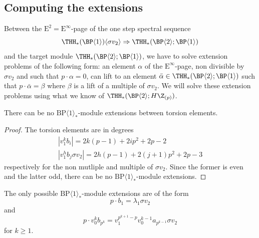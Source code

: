 
\subsection{Computing the extensions}\label{sec:extensions}

Between the $\mathrm{E}^2= \mathrm{E}^\infty$-page of the one step spectral sequence
\begin{equation}
  \THH_*(\BP \langle 1 \rangle)\langle \sigma v_2 \rangle \Rightarrow \THH_*(\BP \langle 2 \rangle ; \BP \langle 1 \rangle)
\end{equation}
and the target module $\THH_*(\BP \langle 2 \rangle ; \BP \langle 1 \rangle)$, we have to solve extension problems of the following form: an element $\alpha$ of the $\mathrm{E}^\infty$-page, non divisible by $\sigma v_2$ and such that $p \cdot \alpha = 0$, can lift to an element $\bar{\alpha} \in \THH_*(\BP \langle 2 \rangle ; \BP \langle 1 \rangle)$ such that $p \cdot \bar{\alpha} = \beta$ where $\beta$ is a lift of a multiple of $\sigma v_2$. We will solve these extension problems using what we know of $\THH_*(\BP \langle 2 \rangle ; H\Z_{(p)})$. 

\begin{lemma}\label{lem432}
  There can be no $\mathrm{BP}\langle 1\rangle_*$-module extensions between torsion elements.
\end{lemma}

\begin{proof}
  The torsion elements are in degrees
  \begin{equation}
    \begin{gathered}
      |v_1^k b_i | = 2k(p-1) + 2i p^2 + 2p - 2 \\
      |v_1^h b_j \sigma v_2| = 2h(p-1) + 2(j+1)p^2 + 2p - 3
    \end{gathered}
  \end{equation}
  respectively for the non mutliple and multiple of $\sigma v_2$. Since the former is even and the latter odd, there can be no $\mathrm{BP}\langle 1\rangle_*$-module extensions.
\end{proof}


\begin{lemma} \label{lem:onlyextensions}
  The only possible $\mathrm{BP}\langle 1\rangle_*$-module extensions %
  are of the form
  \begin{equation}
    p \cdot b_1 = \lambda_1 \sigma v_2
  \end{equation}
  and
  \begin{equation}
    p \cdot v_0^k b_{p^k} = v_1^{p^{k+1} - p}v_0^{k-1} a_{p^{k-1}} \sigma v_2
  \end{equation}
  for $k \geq 1$.
\end{lemma}

